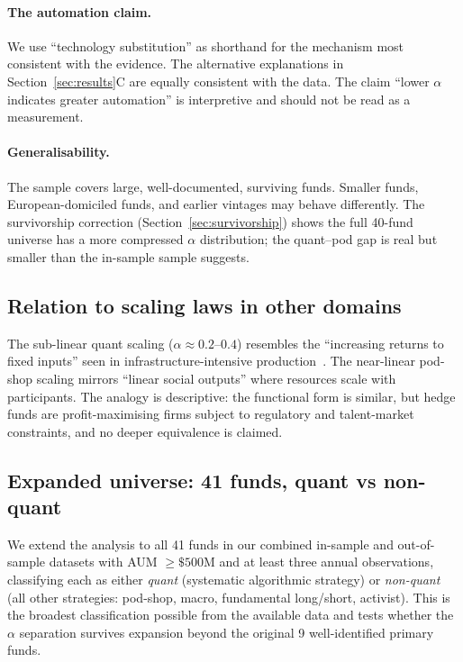 \documentclass[10pt,onecolumn]{article}
\begin{document}
\paragraph{The automation claim.}
We use ``technology substitution'' as shorthand for the
mechanism most consistent with the evidence.
The alternative explanations in Section~\ref{sec:results}C
are equally consistent with the data.
The claim ``lower $\alpha$ indicates greater automation''
is interpretive and should not be read as a measurement.

\paragraph{Generalisability.}
The sample covers large, well-documented, surviving funds.
Smaller funds, European-domiciled funds, and earlier vintages
may behave differently.
The survivorship correction (Section~\ref{sec:survivorship})
shows the full 40-fund universe has a more compressed
$\alpha$ distribution; the quant--pod gap is real but
smaller than the in-sample sample suggests.

\subsection{Relation to scaling laws in other domains}

The sub-linear quant scaling ($\alpha \approx 0.2$--$0.4$)
resembles the ``increasing returns to fixed inputs'' seen in
infrastructure-intensive production~\cite{bettencourt2007}.
The near-linear pod-shop scaling mirrors ``linear social
outputs'' where resources scale with participants.
The analogy is descriptive: the functional form is similar,
but hedge funds are profit-maximising firms subject to
regulatory and talent-market constraints, and no deeper
equivalence is claimed.

\subsection{Expanded universe: 41 funds, quant vs non-quant}
\label{sec:extensions}

We extend the analysis to all 41 funds in our combined
in-sample and out-of-sample datasets with AUM $\geq \$500$M
and at least three annual observations, classifying each as
either \emph{quant} (systematic algorithmic strategy) or
\emph{non-quant} (all other strategies: pod-shop, macro,
fundamental long/short, activist).
This is the broadest classification possible from the available
data and tests whether the $\alpha$ separation survives
expansion beyond the original 9 well-identified primary funds.
\end{document}
